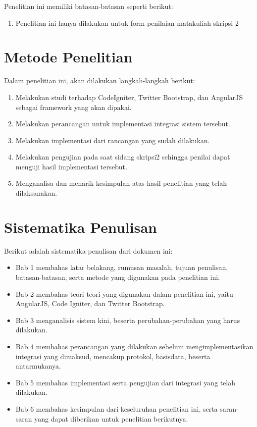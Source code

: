 	Penelitian ini memiliki batasan-batasan seperti berikut:
	
	\begin{enumerate}
		\item Penelitian ini hanya dilakukan untuk form penilaian matakuliah skripsi 2
	\end{enumerate}
	
\section{Metode Penelitian}
\label{sec: metodePenelitian}

Dalam penelitian ini, akan dilakukan langkah-langkah berikut:

\begin{enumerate}
	\item Melakukan studi terhadap CodeIgniter, Twitter Bootstrap, dan AngularJS sebagai framework yang akan dipakai.
	\item Melakukan perancangan untuk implementasi integrasi sistem tersebut.
	\item Melakukan implementasi dari rancangan yang sudah dilakukan.
	\item Melakukan pengujian pada saat sidang skripsi2 sehingga penilai dapat menguji hasil implementasi tersebut.
	\item Menganalisa dan menarik kesimpulan atas hasil penelitian yang telah dilaksanakan.
\end{enumerate}
	
\section{Sistematika Penulisan}
\label{sec: sistematikaPenulisan}

Berikut adalah sistematika penulisan dari dokumen ini:

\begin{itemize}
	\item Bab 1 membahas latar belakang, rumusan masalah, tujuan penulisan, batasan-batasan, serta metode yang digunakan pada penelitian ini.
	\item Bab 2 membahas teori-teori yang digunakan dalam penelitian ini, yaitu AngularJS, Code Igniter, dan Twitter Bootstrap.
	\item Bab 3 menganalisis sistem kini, beserta perubahan-perubahan yang harus dilakukan.
	\item Bab 4 membahas perancangan yang dilakukan sebelum mengimplementasikan integrasi yang dimaksud, mencakup protokol, basisdata, beserta antarmukanya.
	\item Bab 5 membahas implementasi serta pengujian dari integrasi yang telah dilakukan.
	\item Bab 6 membahas kesimpulan dari keseluruhan penelitian ini, serta saran-saran yang dapat diberikan untuk penelitian berikutnya.
\end{itemize}